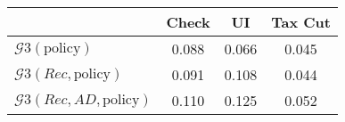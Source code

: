\begin{tabular}{@{}lccc@{}} 
\toprule 
                          & Check      & UI    & Tax Cut    \\  \midrule 
$\mathcal{G}3(\text{policy})$ & 0.088  & 0.066  & 0.045     \\ 
$\mathcal{G}3(Rec,\text{policy})$ & 0.091  & 0.108  & 0.044     \\ 
$\mathcal{G}3(Rec, AD,\text{policy})$ & 0.110  & 0.125  & 0.052     \\ 
\end{tabular}  
